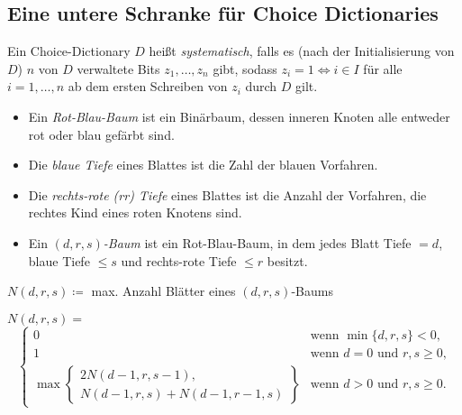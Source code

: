 \documentclass{cheat-sheet}
\begin{document}
\subsection{Eine untere Schranke für Choice Dictionaries}

\begin{defn}
  Ein Choice-Dictionary $D$ heißt \emph{systematisch}, falls es (nach der Initialisierung von $D$) $n$ von $D$ verwaltete Bits $z_1, \ldots, z_n$ gibt, sodass $z_i = 1 \iff i \in I$ für alle $i = 1, \ldots, n$ ab dem ersten Schreiben von $z_i$ durch $D$ gilt.
\end{defn}

\begin{defn}
  \begin{itemize}
    \item Ein \emph{Rot-Blau-Baum} ist ein Binärbaum, dessen inneren Knoten alle entweder rot oder blau gefärbt sind.
    \item Die \emph{blaue Tiefe} eines Blattes ist die Zahl der blauen Vorfahren.
    \item Die \emph{rechts-rote (rr) Tiefe} eines Blattes ist die Anzahl der Vorfahren, die rechtes Kind eines roten Knotens sind.
    \item Ein \emph{$(d, r, s)$-Baum} ist ein Rot-Blau-Baum, in dem jedes Blatt Tiefe $= d$, blaue Tiefe $\leq s$ und rechts-rote Tiefe $\leq r$ besitzt.
  \end{itemize}
\end{defn}

\begin{nota}
  $N(d, r, s) \coloneqq$ max. Anzahl Blätter eines $(d, r, s)$-Baums
\end{nota}

\begin{lem}
  $N(d, r, s) =$
  \[
    \begin{cases}
      0 & \text{wenn $\min \{ d, r, s \} < 0$,} \\
      1 & \text{wenn $d = 0$ und $r, s \geq 0$,} \\
      \max \left\{
        \begin{array}{l}
          2 N(d-1, r, s-1), \\
          N(d{-}1, r, s) + N(d{-}1, r{-}1, s)
        \end{array}
      \right\} & \text{wenn $d > 0$ und $r, s \geq 0$.}
    \end{cases}
  \]
\end{lem}
\end{document}
